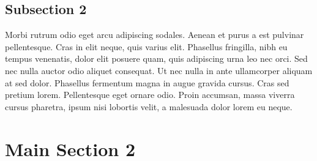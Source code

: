 \documentclass[
  letterpaper,
  11pt,
  english,
  doublespacing,
  headsepline,
  consistentlayout,
  oneside,
  openany]{MastersDoctoralThesis}
\begin{document}
\begin{table}
\centering\centering
\caption{\label{tab:table_param}Parameters of selected SAR images.}
\centering
{}
\end{table}

\subsection{Subsection 2}\label{subsection-2}

Morbi rutrum odio eget arcu adipiscing sodales. Aenean et purus a est
pulvinar pellentesque. Cras in elit neque, quis varius elit. Phasellus
fringilla, nibh eu tempus venenatis, dolor elit posuere quam, quis
adipiscing urna leo nec orci. Sed nec nulla auctor odio aliquet
consequat. Ut nec nulla in ante ullamcorper aliquam at sed dolor.
Phasellus fermentum magna in augue gravida cursus. Cras sed pretium
lorem. Pellentesque eget ornare odio. Proin accumsan, massa viverra
cursus pharetra, ipsum nisi lobortis velit, a malesuada dolor lorem eu
neque.

\section{Main Section 2}\label{main-section-2}
\end{document}
